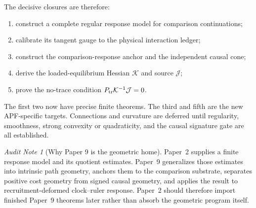 \documentclass[11pt]{article}
\theoremstyle{remark}
\newtheorem{audit}[theorem]{Audit Note}
\newcommand{\Ptr}{P_{\rm tr}}
\begin{document}
\begin{center}
\end{center}

The decisive closures are therefore:
\begin{enumerate}
\item construct a complete regular response model for comparison continuations;
\item calibrate its tangent gauge to the physical interaction ledger;
\item construct the comparison-response anchor and the independent causal cone;
\item derive the loaded-equilibrium Hessian $\mathcal K$ and source $\mathcal J$;
\item prove the no-trace condition $\Ptr\mathcal K^{-1}\mathcal J=0$.
\end{enumerate}
The first two now have precise finite theorems.  The third and fifth are the new APF-specific targets.  Connections and curvature are deferred until regularity, smoothness, strong convexity or quadraticity, and the causal signature gate are all established.

\begin{audit}[Why Paper 9 is the geometric home]
Paper~2 supplies a finite response model and its quotient estimates.  Paper~9 generalizes those estimates into intrinsic path geometry, anchors them to the comparison substrate, separates positive cost geometry from signed causal geometry, and applies the result to recruitment-deformed clock--ruler response.  Paper~2 should therefore import finished Paper~9 theorems later rather than absorb the geometric program itself.
\end{audit}
\end{document}
